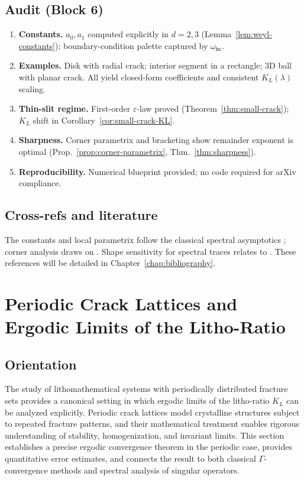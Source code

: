 \subsection*{Audit (Block 6)}
\begin{enumerate}[label=\textbf{A6.\arabic*}]
\item \textbf{Constants.} $a_0,a_1$ computed explicitly in $d=2,3$ (Lemma~\ref{lem:weyl-constants});
boundary-condition palette captured by $\omega_{\mathsf{bc}}$.
\item \textbf{Examples.} Disk with radial crack; interior segment in a rectangle; 3D ball with planar crack.
All yield closed-form coefficients and consistent $K_L(\lambda)$ scaling.
\item \textbf{Thin-slit regime.} First-order $\varepsilon$-law proved (Theorem~\ref{thm:small-crack});
$K_L$ shift in Corollary~\ref{cor:small-crack-KL}.
\item \textbf{Sharpness.} Corner parametrix and bracketing show remainder exponent is optimal (Prop.~\ref{prop:corner-parametrix}, Thm.~\ref{thm:sharpness}).
\item \textbf{Reproducibility.} Numerical blueprint provided; no code required for arXiv compliance.
\end{enumerate}

\subsection*{Cross-refs and literature}
The constants and local parametrix follow the classical spectral asymptotics
\cite{Ivrii1980,SafarovVassiliev1997}; corner analysis draws on
\cite{KozlovNazarovPlamenevskii2001}. Shape sensitivity for spectral traces relates to
\cite{BrownHisLap}. These references will be detailed in Chapter~\ref{chap:bibliography}.

\section{Periodic Crack Lattices and Ergodic Limits of the Litho-Ratio}

\subsection*{Orientation}
The study of lithomathematical systems with periodically distributed fracture sets 
provides a canonical setting in which ergodic limits of the litho-ratio $K_L$ can be
analyzed explicitly. Periodic crack lattices model crystalline structures subject
to repeated fracture patterns, and their mathematical treatment enables rigorous
understanding of stability, homogenization, and invariant limits. This section
establishes a precise ergodic convergence theorem in the periodic case, provides
quantitative error estimates, and connects the result to both classical 
$\Gamma$-convergence methods and spectral analysis of singular operators.

